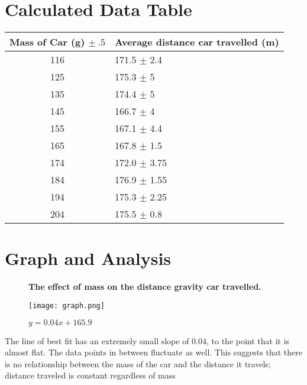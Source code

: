 \documentclass[12pt]{article}
\begin{document}
\section{Calculated Data Table}
\begin{table}[H]
	\centering
	\begin{tabularx}{0.75\textwidth}{|c|X|}
		\hline
		Mass of Car (g) \(\pm\ .5\) & Average distance car travelled (m) \\ \hline
		116                         & 171.5 \(\pm\) 2.4                  \\ \hline
		125                         & 175.3 \(\pm\) 5                    \\ \hline
		135                         & 174.4 \(\pm\) 5                    \\ \hline
		145                         & 166.7 \(\pm\) 4                    \\ \hline
		155                         & 167.1 \(\pm\) 4.4                  \\ \hline
		165                         & 167.8 \(\pm\) 1.5                  \\ \hline
		174                         & 172.0 \(\pm\) 3.75                 \\ \hline
		184                         & 176.9 \(\pm\) 1.55                 \\ \hline
		194                         & 175.3 \(\pm\) 2.25                 \\ \hline
		204                         & 175.5 \(\pm\) 0.8                  \\ \hline
	\end{tabularx}
\end{table}

\section{Graph and Analysis}

\begin{figure}[H]
	\centering
	\textbf{The effect of mass on the distance gravity car travelled.}\medskip\par
	\texttt{[image: graph.png]}
	\caption{\(y=0.04x+165.9\) }
\end{figure}

The line of best fit has an extremely small slope of \(0.04\), to the point that it is almost flat. The data points in between fluctuate as well. This suggests that there is no relationship between the mass of the car and the distance it travels; distance traveled is constant regardless of mass
\end{document}
